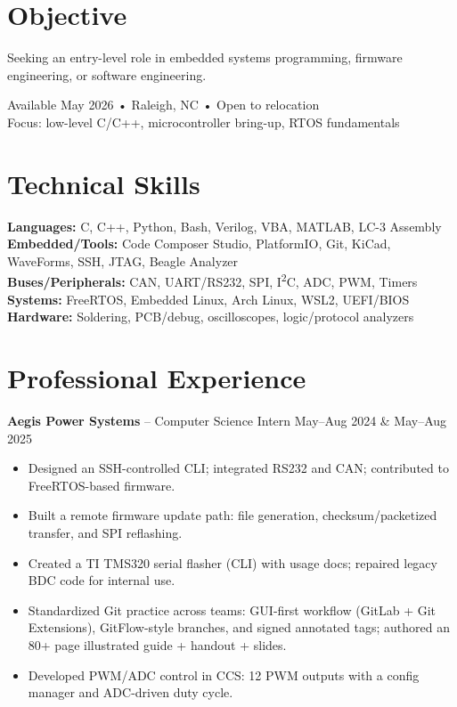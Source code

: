 \documentclass[10pt,letterpaper]{article}
\begin{document}
\section*{Objective}
Seeking an entry-level role in embedded systems programming, firmware engineering, or software engineering.

{\small Available May 2026 • Raleigh, NC • Open to relocation}\\[-2pt]
{\small Focus: low-level C/C++, microcontroller bring-up, RTOS fundamentals}

\section*{Technical Skills}
\textbf{Languages:} C, C++, Python, Bash, Verilog, VBA, MATLAB, LC-3 Assembly \\
\textbf{Embedded/Tools:} Code Composer Studio, PlatformIO, Git, KiCad, WaveForms, SSH, JTAG, Beagle Analyzer \\
\textbf{Buses/Peripherals:} CAN, UART/RS232, SPI, I\textsuperscript{2}C, ADC, PWM, Timers \\
\textbf{Systems:} FreeRTOS, Embedded Linux, Arch Linux, WSL2, UEFI/BIOS \\
\textbf{Hardware:} Soldering, PCB/debug, oscilloscopes, logic/protocol analyzers

\section*{Professional Experience}
\textbf{Aegis Power Systems} -- Computer Science Intern \hfill May--Aug 2024 \& May--Aug 2025
\begin{itemize}
  \item Designed an SSH-controlled CLI; integrated RS232 and CAN; contributed to FreeRTOS-based firmware.
  \item Built a remote firmware update path: file generation, checksum/packetized transfer, and SPI reflashing.
  \item Created a TI TMS320 serial flasher (CLI) with usage docs; repaired legacy BDC code for internal use.
  \item Standardized Git practice across teams: GUI-first workflow (GitLab + Git Extensions), GitFlow-style branches, and signed annotated tags; authored an 80+ page illustrated guide + handout + slides.
  \item Developed PWM/ADC control in CCS: 12 PWM outputs with a config manager and ADC-driven duty cycle.
\end{itemize}
\end{document}
